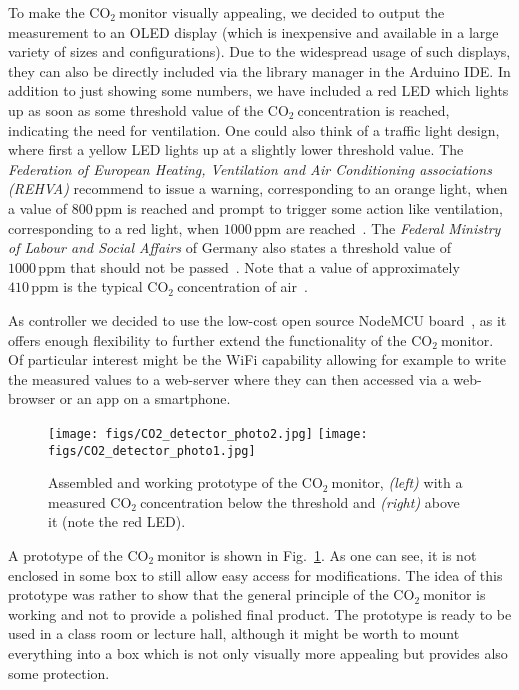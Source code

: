\documentclass[12pt,a4paper]{article}
\newcommand{\coo}{\ensuremath{\mathrm{CO_2}~}}
\begin{document}
To make the \coo monitor visually appealing, we decided to output the measurement to an OLED display (which is inexpensive and available in a large variety of sizes and configurations). Due to the widespread usage of such displays, they can also be directly included via the library manager in the Arduino IDE. In addition to just showing some numbers, we have included a red LED which lights up as soon as some threshold value of the \coo concentration is reached, indicating the need for ventilation. One could also think of a traffic light design, where first a yellow LED lights up at a slightly lower threshold value. The \textit{Federation of European Heating, Ventilation and Air Conditioning associations (REHVA)} recommend to issue a warning, corresponding to an orange light, when a value of $800\,\mathrm{ppm}$ is reached and prompt to trigger some action like ventilation, corresponding to a red light, when $1000\,\mathrm{ppm}$ are reached~\cite{REHVA2020}. The \textit{Federal Ministry of Labour and Social Affairs} of Germany also states a threshold value of $1000\,\mathrm{ppm}$ that should not be passed~\cite{BMA2020}. Note that a value of approximately $410\,\mathrm{ppm}$ is the typical \coo concentration of air~\cite{NOAA2020}.

As controller we decided to use the low-cost open source NodeMCU board~\cite{NODEMCU2020}, as it offers enough flexibility to further extend the functionality of the \coo monitor. Of particular interest might be the WiFi capability allowing for example to write the measured values to a web-server where they can then accessed via a web-browser or an app on a smartphone. 

\begin{figure}[ht]
\centering
\texttt{[image: figs/CO2\_detector\_photo2.jpg]}
\hspace{1em}
\texttt{[image: figs/CO2\_detector\_photo1.jpg]}
\caption{Assembled and working prototype of the \coo monitor, \textit{(left)} with a measured \coo concentration below the threshold and \textit{(right)} above it (note the red LED).}
\label{f:CO2_monitor_photo}
\end{figure}
A prototype of the \coo monitor is shown in Fig.~\ref{f:CO2_monitor_photo}. As one can see, it is not enclosed in some box to still allow easy access for modifications. The idea of this prototype was rather to show that the general principle of the \coo monitor is working and not to provide a polished final product. The prototype is ready to be used in a class room or lecture hall, although it might be worth to mount everything into a box which is not only visually more appealing but provides also some protection.
\end{document}

